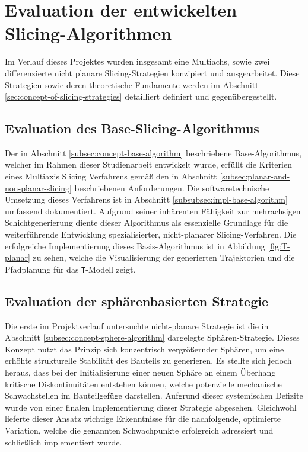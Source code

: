  \section{Evaluation der entwickelten Slicing-Algorithmen} \label{sec:evaluation-of-slicing-algorithms}
    Im Verlauf dieses Projektes wurden insgesamt eine Multiachs, sowie zwei differenzierte nicht planare Slicing-Strategien konzipiert und ausgearbeitet.
    Diese Strategien sowie deren theoretische Fundamente werden im Abschnitt \ref{sec:concept-of-slicing-strategies} detailliert definiert und gegenübergestellt.

    \subsection{Evaluation des Base-Slicing-Algorithmus}\label{subsec:evaluation-of-base-slicer}
      Der in Abschnitt \ref{subsec:concept-base-algorithm} beschriebene Base-Algorithmus, welcher im Rahmen dieser Studienarbeit entwickelt wurde, erfüllt die Kriterien eines Multiaxis Slicing Verfahrens gemäß den in Abschnitt \ref{subsec:planar-and-non-planar-slicing} beschriebenen Anforderungen.
      Die softwaretechnische Umsetzung dieses Verfahrens ist in Abschnitt \ref{subsubsec:impl-base-algorithm} umfassend dokumentiert.
      Aufgrund seiner inhärenten Fähigkeit zur mehrachsigen Schichtgenerierung diente dieser Algorithmus als essenzielle Grundlage für die weiterführende Entwicklung spezialisierter, nicht-planarer Slicing-Verfahren.
      Die erfolgreiche Implementierung dieses Basis-Algorithmus ist in Abbildung \ref{fig:T-planar} zu sehen, welche die Visualisierung der generierten Trajektorien und die Pfadplanung für das \texttt{T}-Modell zeigt.

    \subsection{Evaluation der sphärenbasierten Strategie}\label{subsec:evaluation-of-sphere-slicer}
      Die erste im Projektverlauf untersuchte nicht-planare Strategie ist die in Abschnitt \ref{subsec:concept-sphere-algorithm} dargelegte Sphären-Strategie.
      Dieses Konzept nutzt das Prinzip sich konzentrisch vergrößernder Sphären, um eine erhöhte strukturelle Stabilität des Bauteils zu generieren.
      Es stellte sich jedoch heraus, dass bei der Initialisierung einer neuen Sphäre an einem Überhang kritische Diskontinuitäten entstehen können, welche potenzielle mechanische Schwachstellen im Bauteilgefüge darstellen.
      Aufgrund dieser systemischen Defizite wurde von einer finalen Implementierung dieser Strategie abgesehen.
      Gleichwohl lieferte dieser Ansatz wichtige Erkenntnisse für die nachfolgende, optimierte Variation, welche die genannten Schwachpunkte erfolgreich adressiert und schließlich implementiert wurde.

